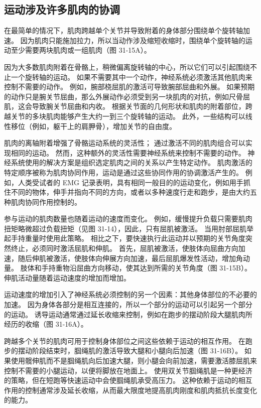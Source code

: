\subsection{运动涉及许多肌肉的协调}
在最简单的情况下，肌肉跨越单个关节并导致附着的身体部分围绕单个旋转轴加速。 因为肌肉只能施加拉力，所以当动作涉及缩短收缩时，围绕单个旋转轴的运动至少需要两块肌肉或一组肌肉（图 31-15A）。

因为大多数肌肉附着在骨骼上，稍微偏离旋转轴的中心，所以它们可以引起围绕不止一个旋转轴的运动。 如果不需要其中一个动作，神经系统必须激活其他肌肉来控制不需要的动作。 例如，腕部桡屈肌的激活可导致腕部屈曲和外展。 如果预期的动作只是腕关节屈曲，那么外展动作必须受到另一块肌肉的对抗，例如尺骨屈肌，这会导致腕关节屈曲和内收。 根据关节面的几何形状和肌肉的附着部位，跨越关节的多块肌肉能够产生大约一到三个旋转轴的运动。 此外，一些结构可以线性移位（例如，躯干上的肩胛骨），增加关节的自由度。

肌肉的离轴附着增强了骨骼运动系统的灵活性； 通过激活不同的肌肉组合可以实现相同的运动。 然而，这种额外的灵活性需要神经系统来控制不需要的动作。 神经系统使用的解决方案是组织选定肌肉之间的关系以产生特定动作。 肌肉激活的特定顺序被称为肌肉协同作用，运动是通过这些协同作用的协调激活产生的。 例如，人类受试者的 EMG 记录表明，具有相同一般目的的运动变化，例如用手抓住不同的物体，伸手并指向不同的方向，或者以多种速度行走和跑步，是由大约五种肌肉协同作用控制的。

参与运动的肌肉数量也随着运动的速度而变化。 例如，缓慢提升负载只需要肌肉扭矩略微超过负载扭矩（见图 31-14），因此，只有屈肌被激活。 当用肘部屈肌举起手持重量时使用此策略。 相比之下，要快速执行此运动并以预期的关节角度突然终止，必须同时激活屈肌和伸肌。 首先，屈肌被激活，使肢体向屈曲方向加速，随后伸肌被激活，使肢体向伸展方向加速，最后屈肌爆发性活动，增加角动量。 肢体和手持重物沿屈曲方向移动，使其达到所需的关节角度（图 31-15B）。 伸肌活动量随着运动速度的增加而增加。

运动速度的增加引入了神经系统必须控制的另一个因素：其他身体部位的不必要的加速。 因为身体各部分是相互连接的，所以一个部分的运动可以引起另一个部分的运动。 诱导运动通常通过延长收缩来控制，例如在跑步的摆动阶段大腿肌肉所经历的收缩（图 31-16A）。

跨越多个关节的肌肉可用于控制身体部位之间这些依赖于运动的相互作用。 在跑步的摆动阶段结束时，腘绳肌的激活导致大腿和小腿向后加速（图 31-16B）。 如果使用髋伸肌而不是腘绳肌向后加速大腿，则小腿会向前加速，需要激活膝屈肌来控制不需要的小腿运动，以便将脚放在地面上。 使用双关节腘绳肌是一种更经济的策略，但在短跑等快速运动中会使腘绳肌承受高压力。 这种依赖于运动的相互作用的控制通常涉及延长收缩，从而最大限度地提高肌肉刚度和肌肉抵抗长度变化的能力。

